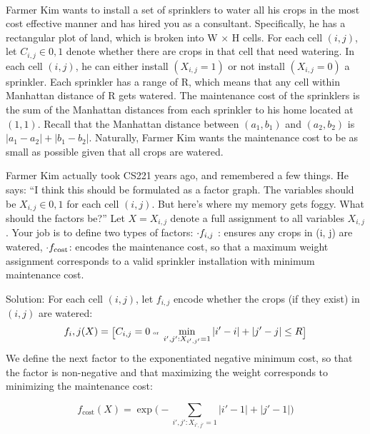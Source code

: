 \documentclass[4pt,landscape]{article}
\begin{document}
\begin{multicols*}{4}
 {\color{purple} \hrulefill}\\
{\tiny Farmer Kim wants to install a set of sprinklers to water all his crops in the most cost effective manner and has hired you as a consultant. Specifically, he has a rectangular plot of land, which is broken into W × H cells. For each cell $(i, j)$, let $C_{i,j} \in {0, 1}$ denote whether there are crops in that cell that need watering. In each cell $(i, j)$, he can either install $(X_{i,j} = 1)$ or not install $(X_{i,j} = 0)$ a sprinkler. Each sprinkler has a range of R, which means that any cell within Manhattan distance of R gets watered. The maintenance cost of the sprinklers is the sum of the Manhattan distances from each sprinkler to his home located at $(1, 1)$. Recall that the Manhattan distance between $(a_1, b_1)$ and $(a_2, b_2)$ is $|a_1 −a_2|+|b_1 −b_2|$. Naturally, Farmer Kim wants the maintenance cost to be as small as possible given that all crops are watered.}\par
{\tiny Farmer Kim actually took CS221 years ago, and remembered a few things. He says: “I
think this should be formulated as a factor graph. The variables should be $X_{i,j} \in {0, 1}$ for
each cell $(i, j)$. But here’s where my memory gets foggy. What should the factors be?”
Let $X = {X_{i,j}}$ denote a full assignment to all variables $X_{i,j}$ . Your job is to define two
types of factors:
$\tiny \cdot f_{i,j}$ : ensures any crops in (i, j) are watered,
$\tiny \cdot f_{\text{cost}}$: encodes the maintenance cost,
so that a maximum weight assignment corresponds to a valid sprinkler installation with
minimum maintenance cost.}\par
{\tiny \color{purple}Solution:} For each cell $(i, j)$, let $f_{i,j}$ encode whether the crops (if they exist) in $(i, j)$ are
watered:
\vspace*{-0.05cm}
\[\tiny f_i,j (X) = \big[C_{i,j} = 0\; \text{or}\; \displaystyle\min_{i',j':X_{i',j'}=1}|i'-i|+|j'-j|\le R\big]\]
{We define the next factor to the exponentiated negative minimum cost, so that
the factor is non-negative and that maximizing the weight corresponds to minimizing the
maintenance cost:}\par
\vspace{-0.10cm}$$f_{\text{cost}}(X) = \exp\Big(-\displaystyle\sum_{i',j':X_{i',j'}=1}|i'-1|+|j'-1|\Big)$$
 
 {\color{purple} \hrulefill}\\


\end{multicols*}
\end{document}
